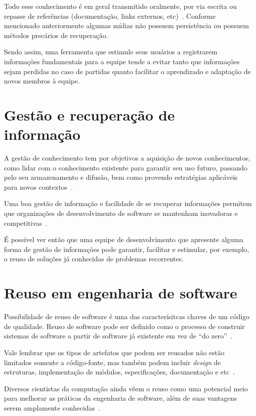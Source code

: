 Todo esse conhecimento é em geral transmitido oralmente, por via escrita ou repasse de referências (documentação, links externos, etc)~\cite{Storey2014, Olson2000, CubraniC2004}. Conforme mencionado anteriormente algumas mídias não possuem persistência ou possuem métodos precários de recuperação.

Sendo assim, uma ferramenta que estimule seus usuários a registrarem informações fundamentais para a equipe tende a evitar tanto que informações sejam perdidas no caso de partidas quanto facilitar o aprendizado e adaptação de novos membros à equipe.

\section{Gestão e recuperação de informação}

A gestão de conhecimento tem por objetivos a aquisição de novos conhecimentos, como lidar com o conhecimento existente para garantir seu uso futuro, passando pelo seu armazenamento e difusão, bem como provendo estratégias aplicáveis para novos contextos~\cite{Bjornson2008}.

Uma boa gestão de informação e facilidade de se recuperar informações permitem que organizações de desenvolvimento de software se mantenham inovadoras e competitivas~\cite{Rabelo2015}.

É possível ver então que uma equipe de desenvolvimento que apresente alguma forma de gestão de informações pode garantir, facilitar e estimular, por exemplo, o reuso de soluções já conhecidas de problemas recorrentes.

\section{Reuso em engenharia de software}

Possibilidade de reuso de software é uma das caracterísitcas chaves de um código de qualidade. Reuso de software pode ser definido como o processo de construir sistemas de software a partir de software já existente em vez de ``do zero''~\cite{Krueger1992}.

Vale lembrar que os tipos de artefatos que podem ser reusados não estão limitados somente a código-fonte, mas também podem incluir \textit{design} de estruturas, implementação de módulos, especificações, documentação e etc~\cite{Freeman1993}.

Diversos cientistas da computação ainda vêem o reuso como uma potencial meio para melhorar as práticas da engenharia de software, além de suas vantagens serem amplamente conhecidas~\cite{Krueger1992}.

